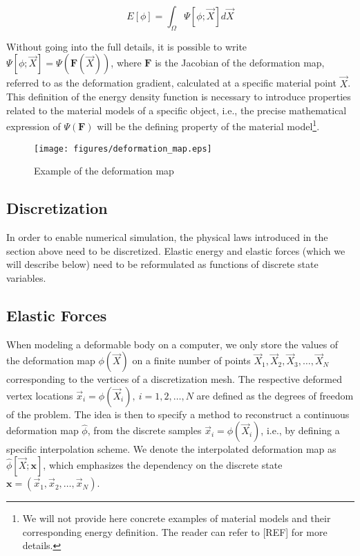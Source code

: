 \documentclass{article} %
\begin{document}
\begin{equation}
E[\phi] =  \int_{\Omega} \Psi [ \phi ; \overrightarrow{X} ] d\overrightarrow{X}
\label{eq:energy-eq}
\end{equation}

Without going into the full details, it is possible to write $\Psi[\phi ; \overrightarrow{X}] = \Psi ( \mathbf{F} (\overrightarrow{X}) )$, where $\mathbf{F}$ is the Jacobian of the deformation map, referred to as the deformation gradient, calculated at a specific material point $\overrightarrow{X}$. This definition of the energy density function is necessary to introduce properties related to the material models of a specific object, i.e., the precise mathematical expression of $\Psi(\mathbf{F})$ will be the defining property of the material model\footnote{We will not provide here concrete examples of material models and their corresponding energy definition. The reader can refer to [REF] for more details.}. 

\begin{figure}
\centering
\texttt{[image: figures/deformation\_map.eps]}
\label{fig:def_map}
\caption{Example of the deformation map}
\end{figure}

\subsection{Discretization}

In order to enable numerical simulation, the physical laws introduced in the section above need to be discretized. Elastic energy and elastic forces (which we will describe below) need to be reformulated as functions of discrete state variables. 

\subsection{Elastic Forces}\label{sec:el-forces}

When modeling a deformable body on a computer, we only store the values of the deformation map $\phi( \overrightarrow{X} )$ on a finite number of points $\overrightarrow{X}_1, \overrightarrow{X}_2, \overrightarrow{X}_3, \dots, \overrightarrow{X}_N$ corresponding to the vertices of a discretization mesh. The respective deformed vertex locations $\overrightarrow{x}_i = \phi(\overrightarrow{X}_i),\ i = 1, 2, \dots, N$ are defined as the degrees of freedom of the problem. The idea is then to specify a method to reconstruct a continuous deformation map $\hat{\phi}$, from the discrete samples $\overrightarrow{x}_i = \phi(\overrightarrow{X}_i)$, i.e., by defining a specific interpolation scheme. We denote the interpolated deformation map as $\hat{\phi}[\overrightarrow{X}; \mathbf{x}]$, which emphasizes the dependency on the discrete state $\mathbf{x} = (\overrightarrow{x}_1, \overrightarrow{x}_2 , \dots, \overrightarrow{x}_N )$. 
\end{document}

